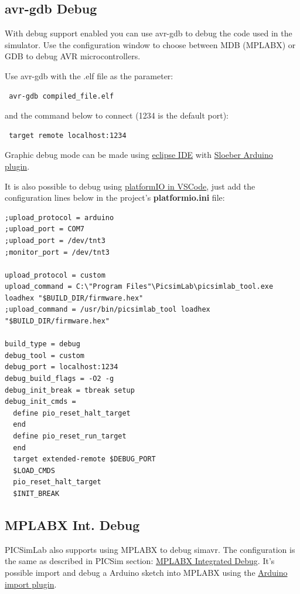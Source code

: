 \subsection{avr-gdb Debug} \hypertarget{def:gdbavr}{}
 
 With debug support enabled you can use avr-gdb to debug the code used in the simulator. 
 Use the configuration window to choose between MDB (MPLABX) or GDB to debug AVR microcontrollers. 
 
 
 Use avr-gdb with the .elf file as the parameter:
 \begin{verbatim}
 avr-gdb compiled_file.elf
 \end{verbatim}
 and the command below to connect (1234 is the default port):
 \begin{verbatim}
 target remote localhost:1234
 \end{verbatim}

Graphic debug mode can be made using \href{https://www.eclipse.org/}{eclipse IDE} with \href{https://eclipse.baeyens.it/}{Sloeber Arduino plugin}.

It is also possible to debug using \href{https://platformio.org/}{platformIO in VSCode}, just add the configuration lines below in the project's \textbf{platformio.ini} file:
\begin{verbatim}
;upload_protocol = arduino
;upload_port = COM7
;upload_port = /dev/tnt3
;monitor_port = /dev/tnt3

upload_protocol = custom
upload_command = C:\"Program Files"\PicsimLab\picsimlab_tool.exe loadhex "$BUILD_DIR/firmware.hex"
;upload_command = /usr/bin/picsimlab_tool loadhex "$BUILD_DIR/firmware.hex"

build_type = debug
debug_tool = custom
debug_port = localhost:1234
debug_build_flags = -O2 -g
debug_init_break = tbreak setup
debug_init_cmds =
  define pio_reset_halt_target
  end
  define pio_reset_run_target
  end
  target extended-remote $DEBUG_PORT
  $LOAD_CMDS
  pio_reset_halt_target
  $INIT_BREAK
\end{verbatim}

\subsection{MPLABX Int. Debug }
PICSimLab also supports using MPLABX to debug simavr. The configuration is the same as described in PICSim section: \hyperlink{def:mplabxd}{MPLABX Integrated Debug}. 
It's possible import and debug a Arduino sketch into MPLABX using the \href{https://github.com/janegilruud/chipKIT-importer-2.0}{Arduino import plugin}.

